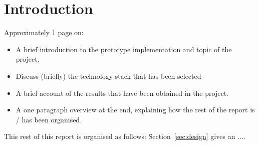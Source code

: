 \section{Introduction}
\label{sec:introduction}

Approximately 1 page on:

\begin{itemize}

\item A brief introduction to the prototype implementation and topic of the project.

\item Discuss (briefly) the technology stack that has been selected

\item A brief account of the results that have been obtained in the project.

\item A one paragraph overview at the end, explaining how the rest of the report is / has been organised.

\end{itemize}

\noindent
This rest of this report is organised as follows:
Section~\ref{sec:design} gives an ....
